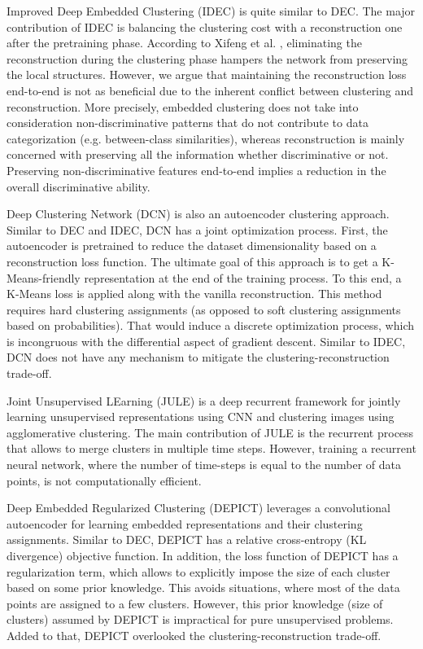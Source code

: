 \documentclass{article}
\begin{document}
Improved Deep Embedded Clustering (IDEC) \cite{paper28} is quite similar to DEC. The major contribution of IDEC is balancing the clustering cost with a reconstruction one after the pretraining phase. According to Xifeng et al. \cite{paper28}, eliminating the reconstruction during the clustering phase hampers the network from preserving the local structures. However, we argue that maintaining the reconstruction loss end-to-end is not as beneficial due to the inherent conflict between clustering and reconstruction. More precisely, embedded clustering does not take into consideration non-discriminative patterns that do not contribute to data categorization (e.g. between-class similarities), whereas reconstruction is mainly concerned with preserving all the information whether discriminative or not. Preserving non-discriminative features end-to-end implies a reduction in the overall discriminative ability.

Deep Clustering Network (DCN) \cite{paper29} is also an autoencoder clustering approach. Similar to DEC and IDEC, DCN has a joint optimization process. First, the autoencoder is pretrained to reduce the dataset dimensionality based on a reconstruction loss function. The ultimate goal of this approach is to get a K-Means-friendly representation at the end of the training process. To this end, a K-Means loss is applied along with the vanilla reconstruction. This method requires hard clustering assignments (as opposed to soft clustering assignments based on probabilities). That would induce a discrete optimization process, which is incongruous with the differential aspect of gradient descent. Similar to IDEC, DCN does not have any mechanism to mitigate the clustering-reconstruction trade-off.

Joint Unsupervised LEarning (JULE) \cite{paper22} is a deep recurrent framework for jointly learning unsupervised representations using CNN and clustering images using agglomerative clustering. The main contribution of JULE is the recurrent process that allows to merge clusters in multiple time steps. However, training a recurrent neural network, where the number of time-steps is equal to the number of data points, is not computationally efficient.

Deep Embedded Regularized Clustering (DEPICT) \cite{paper36} leverages a convolutional autoencoder for learning embedded representations and their clustering assignments. Similar to DEC, DEPICT has a relative cross-entropy (KL divergence) objective function. In addition, the loss function of DEPICT has a regularization term, which allows to explicitly impose the size of each cluster based on some prior knowledge. This avoids situations, where most of the data points are assigned to a few clusters. However, this prior knowledge (size of clusters) assumed by DEPICT is impractical for pure unsupervised problems. Added to that, DEPICT overlooked the clustering-reconstruction trade-off.
\end{document}
